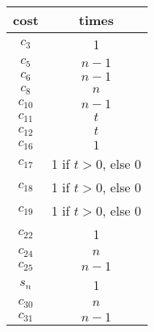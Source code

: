 \documentclass{article}
\begin{document}
\begin{tabular}{|c|c|}
\hline 
cost & times \\ 
\hline 
$c_3$ & 1 \\ 
\hline 
$c_5$ & $n-1$ \\ 
\hline 
$c_6$ & $n-1$ \\ 
\hline 
$c_8$ & $n$ \\ 
\hline 
$c_{10}$ & $n-1$ \\ 
\hline 
$c_{11}$ & $t$ \\ 
\hline 
$c_{12}$ & $t$ \\ 
\hline 
$c_{16}$ & $1$ \\ 
\hline 
$c_{17}$ & 1 if $t>0$, else 0 \\
\hline
$c_{18}$ & 1 if $t>0$, else 0 \\
\hline
$c_{19}$ & 1 if $t>0$, else 0 \\
\hline
$c_{22}$ & 1 \\
\hline
$c_{24}$ & $n$ \\
\hline
$c_{25}$ & $n-1$ \\
\hline
$s_n$ & 1 \\
\hline
$c_{30}$ & $n$ \\
\hline
$c_{31}$ & $n-1$ \\
\hline
\end{tabular} 
\end{document}
